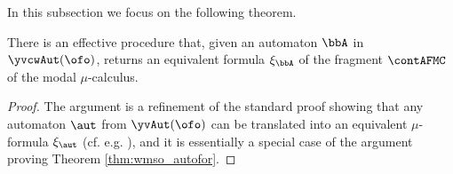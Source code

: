 


In this subsection we focus on the following theorem.

\begin{theorem}\label{t:autofor}
There is an effective procedure that, given an automaton $\bbA$ in
$\yvcwAut(\ofo)$, returns an equivalent formula $\xi_{\bbA}$ of the fragment 
$\contAFMC$ of the modal $\mu$-calculus.
\end{theorem}

\begin{proof}
The argument  is a refinement of the standard proof showing that any automaton 
$\aut$ from $\yvAut(\ofo)$ can be translated into an equivalent $\mu$-formula 
$\xi_\aut$ (cf. e.g. \cite{Ven08}), and it is essentially a special case of the argument proving Theorem \ref{thm:wmso_autofor}.




\end{proof}
